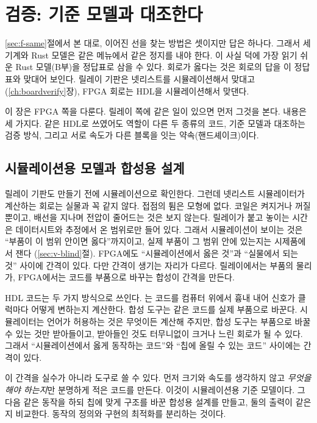 \chapter{검증: 기준 모델과 대조한다}\label{ch:verify}

\ref{sec:f-same}절에서 본 대로, 이어진 선을 찾는 방법은 셋이지만 답은 하나다. 그래서 세 기계와 Rust 모델은
같은 메뉴에서 같은 정지를 내야 한다. 이 사실 덕에 가장 읽기 쉬운 Rust 모델(B부)을 정답표로 삼을 수 있다. 회로가
옳다는 것은 회로의 답을 이 정답표와 맞대어 보인다. 릴레이 기판은 넷리스트를 시뮬레이션해서 맞대고
(\ref{ch:boardverify}장), FPGA 회로는 HDL을 시뮬레이션해서 맞댄다.

이 장은 FPGA 쪽을 다룬다. 릴레이 쪽에 같은 일이 있으면 먼저 그것을 본다. 내용은 세 가지다. 같은 HDL로
쓰였어도 역할이 다른 두 종류의 코드, 기준 모델과 대조하는 검증 방식, 그리고 서로 속도가 다른 블록을 잇는
약속(핸드셰이크)이다.

\section{시뮬레이션용 모델과 합성용 설계}\label{sec:sim-vs-synth}

\Relay 릴레이 기판도 만들기 전에 시뮬레이션으로 확인한다. 그런데 넷리스트 시뮬레이터가 계산하는 회로는 실물과
꼭 같지 않다. 접점의 튐은 모형에 없다. 코일은 켜지거나 꺼질 뿐이고, 배선을 지나며 전압이 줄어드는 것은 보지
않는다. 릴레이가 붙고 놓이는 시간은 데이터시트와 추정에서 온 범위로만 들어 있다. 그래서 시뮬레이션이 보이는
것은 ``부품이 이 범위 안이면 옳다''까지이고, 실제 부품이 그 범위 안에 있는지는 시제품에서 잰다
(\ref{sec:v-blind}절). FPGA에도 ``시뮬레이션에서 옳은 것''과 ``실물에서 되는 것'' 사이에 간격이 있다.
다만 간격이 생기는 자리가 다르다. 릴레이에서는 부품의 물리가, FPGA에서는 코드를 부품으로 바꾸는 합성이 간격을
만든다.

\Why HDL 코드는 두 가지 방식으로 쓰인다. 는 코드를 컴퓨터 위에서 흉내 내어
신호가 클럭마다 어떻게 변하는지 계산한다. 합성 도구는 같은 코드를 실제 부품으로 바꾼다. 시뮬레이터는
언어가 허용하는 것은 무엇이든 계산해 주지만, 합성 도구는 부품으로 바꿀 수 있는 것만 받아들이고, 받아들인
것도 터무니없이 크거나 느린 회로가 될 수 있다. 그래서 ``시뮬레이션에서 옳게 동작하는 코드''와 ``칩에
올릴 수 있는 코드'' 사이에는 간격이 있다.

이 간격을 실수가 아니라 도구로 쓸 수 있다. 먼저 크기와 속도를 생각하지 않고 \emph{무엇을 해야 하는지}만
분명하게 적은 코드를 만든다. 이것이 시뮬레이션용 기준 모델이다. 그다음 같은 동작을 하되 칩에 맞게 구조를
바꾼 합성용 설계를 만들고, 둘의 출력이 같은지 비교한다. 동작의 정의와 구현의 최적화를 분리하는 것이다.

